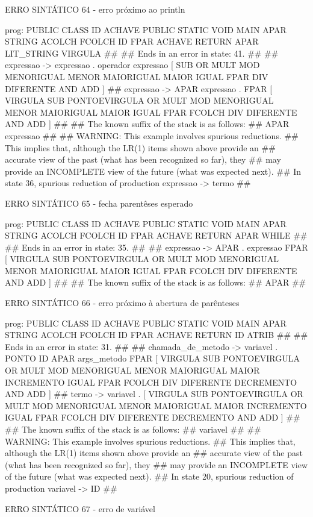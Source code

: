 \documentclass[12pt,a4paper,twoside]{report}
\begin{document}
\begin{terminal}
{ERRO SINTÁTICO 64 - erro próximo ao println

prog: PUBLIC CLASS ID ACHAVE PUBLIC STATIC VOID MAIN APAR STRING ACOLCH FCOLCH ID FPAR ACHAVE RETURN APAR LIT_STRING VIRGULA 
##
## Ends in an error in state: 41.
##
## expressao -> expressao . operador expressao [ SUB OR MULT MOD MENORIGUAL MENOR MAIORIGUAL MAIOR IGUAL FPAR DIV DIFERENTE AND ADD ]
## expressao -> APAR expressao . FPAR [ VIRGULA SUB PONTOEVIRGULA OR MULT MOD MENORIGUAL MENOR MAIORIGUAL MAIOR IGUAL FPAR FCOLCH DIV DIFERENTE AND ADD ]
##
## The known suffix of the stack is as follows:
## APAR expressao 
##
## WARNING: This example involves spurious reductions.
## This implies that, although the LR(1) items shown above provide an
## accurate view of the past (what has been recognized so far), they
## may provide an INCOMPLETE view of the future (what was expected next).
## In state 36, spurious reduction of production expressao -> termo 
##

ERRO SINTÁTICO 65 - fecha parentêses esperado

prog: PUBLIC CLASS ID ACHAVE PUBLIC STATIC VOID MAIN APAR STRING ACOLCH FCOLCH ID FPAR ACHAVE RETURN APAR WHILE 
##
## Ends in an error in state: 35.
##
## expressao -> APAR . expressao FPAR [ VIRGULA SUB PONTOEVIRGULA OR MULT MOD MENORIGUAL MENOR MAIORIGUAL MAIOR IGUAL FPAR FCOLCH DIV DIFERENTE AND ADD ]
##
## The known suffix of the stack is as follows:
## APAR 
##

ERRO SINTÁTICO 66 - erro próximo à abertura de parênteses

prog: PUBLIC CLASS ID ACHAVE PUBLIC STATIC VOID MAIN APAR STRING ACOLCH FCOLCH ID FPAR ACHAVE RETURN ID ATRIB 
##
## Ends in an error in state: 31.
##
## chamada_de_metodo -> variavel . PONTO ID APAR args_metodo FPAR [ VIRGULA SUB PONTOEVIRGULA OR MULT MOD MENORIGUAL MENOR MAIORIGUAL MAIOR INCREMENTO IGUAL FPAR FCOLCH DIV DIFERENTE DECREMENTO AND ADD ]
## termo -> variavel . [ VIRGULA SUB PONTOEVIRGULA OR MULT MOD MENORIGUAL MENOR MAIORIGUAL MAIOR INCREMENTO IGUAL FPAR FCOLCH DIV DIFERENTE DECREMENTO AND ADD ]
##
## The known suffix of the stack is as follows:
## variavel 
##
## WARNING: This example involves spurious reductions.
## This implies that, although the LR(1) items shown above provide an
## accurate view of the past (what has been recognized so far), they
## may provide an INCOMPLETE view of the future (what was expected next).
## In state 20, spurious reduction of production variavel -> ID 
##

ERRO SINTÁTICO 67 - erro de variável

}
\end{terminal}
\end{document}
